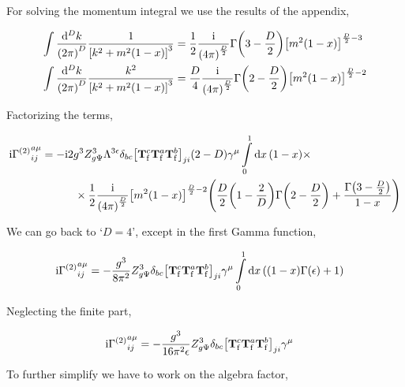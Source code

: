 For solving the momentum integral we use the results of the appendix,

\begin{align}
    \int\frac{\dd[D]{k}}{\qty(2\pi)^D}\frac{1}{\qty[k^2+m^2\qty(1-x)]^3}&=\frac12\frac{\textnormal{i}}{\qty(4\pi)^{\frac D2}}\Gamma\qty(3-\frac D2)\qty[m^2\qty(1-x)]^{\frac D2 -3}\nonumber\\
    \int\frac{\dd[D]{k}}{\qty(2\pi)^D}\frac{k^2}{\qty[k^2+m^2\qty(1-x)]^3}&=\frac D4\frac{\textnormal{i}}{\qty(4\pi)^{\frac D2}}\Gamma\qty(2-\frac D2)\qty[m^2\qty(1-x)]^{\frac D2 -2}\nonumber
\end{align}

Factorizing the terms,

\begin{align}
    \textnormal{i}{\Gamma^{\qty(2)}}^{a\mu}_{ij}&=-\textnormal{i}2 g^3Z_{g\Psi}^3\Lambda^{3\epsilon}\delta_{bc}
    \qty[{\vb T^c_{\textnormal{f}}}{\vb T^a_{\textnormal{f}}}{\vb T^b_{\textnormal{f}}}]_{ji}\qty(2-D)\gamma^\mu
    \int\limits_0^1\dd{x}\qty(1-x)\times\nonumber\\
    &\quad\quad\quad\times\frac12\frac{\textnormal{i}}{\qty(4\pi)^{\frac D2}}\qty[m^2\qty(1-x)]^{\frac D2-2}
    \qty(\frac D2\qty(1-\frac2D)\Gamma\qty(2-\frac D2)+\frac{\Gamma\qty(3-\frac D2)}{1-x})\nonumber
\end{align}

We can go back to `$D=4$', except in the first Gamma function,

\begin{align}
    \textnormal{i}{\Gamma^{\qty(2)}}^{a\mu}_{ij}&=-\frac{g^3}{8\pi^2} Z_{g\Psi}^3\delta_{bc}
    \qty[{\vb T^c_{\textnormal{f}}}{\vb T^a_{\textnormal{f}}}{\vb T^b_{\textnormal{f}}}]_{ji}\gamma^\mu
    \int\limits_0^1\dd{x}
    \qty(\qty(1-x)\Gamma\qty(\epsilon)+1)\nonumber
\end{align}

Neglecting the finite part,

\begin{align}
    \textnormal{i}{\Gamma^{\qty(2)}}^{a\mu}_{ij}&=-\frac{g^3}{16\pi^2\epsilon} Z_{g\Psi}^3\delta_{bc}
    \qty[{\vb T^c_{\textnormal{f}}}{\vb T^a_{\textnormal{f}}}{\vb T^b_{\textnormal{f}}}]_{ji}\gamma^\mu\nonumber
\end{align}

To further simplify we have to work on the algebra factor,


